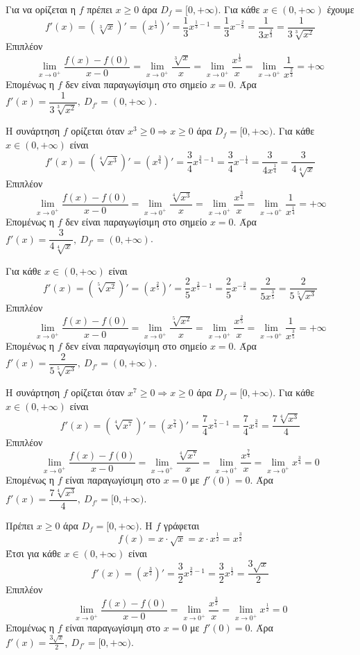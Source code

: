 \begin{alist}
\item Για να ορίζεται η $ f $ πρέπει $ x\geq 0 $ άρα $ D_f=[0,+\infty) $. Για κάθε $ x\in(0,+\infty) $ έχουμε
\[ f'(x)=(\sqrt[3]{x})'=\left(x^{\frac{1}{3}}\right)'=\frac{1}{3}x^{\frac{1}{3}-1}=\frac{1}{3}x^{-\frac{2}{3}}=\frac{1}{3x^{\frac{2}{3}}}=\frac{1}{3\sqrt[3]{x^2}} \]
Επιπλέον
\[ \lim_{x\to 0^+}{\frac{f(x)-f(0)}{x-0}}=\lim_{x\to 0^+}\frac{\sqrt[3]{x}}{x}=\lim_{x\to 0^+}{\frac{x^{\frac{1}{3}}}{x}}=\lim_{x\to 0^+}{\frac{1}{x^{\frac{2}{3}}}}=+\infty \]
Επομένως η $ f $ δεν είναι παραγωγίσιμη στο σημείο $ x=0 $. Άρα $ f'(x)=\dfrac{1}{3\sqrt[3]{x^2}},\ D_{f'}=(0,+\infty) $.
\item Η συνάρτηση $ f $ ορίζεται όταν $ x^3\geq 0\Rightarrow x\geq 0 $ άρα $ D_f=[0,+\infty) $. Για κάθε $ x\in(0,+\infty) $ είναι
\[ f'(x)=(\sqrt[4]{x^3})'=\left(x^{\frac{3}{4}}\right)'=\frac{3}{4}x^{\frac{3}{4}-1}=\frac{3}{4}x^{-\frac{1}{4}}=\frac{3}{4x^{\frac{1}{4}}}=\frac{3}{4\sqrt[4]{x}} \]
Επιπλέον
\[ \lim_{x\to 0^+}{\frac{f(x)-f(0)}{x-0}}=\lim_{x\to 0^+}\frac{\sqrt[4]{x^3}}{x}=\lim_{x\to 0^+}{\frac{x^{\frac{3}{4}}}{x}}=\lim_{x\to 0^+}{\frac{1}{x^{\frac{1}{4}}}}=+\infty \]
Επομένως η $ f $ δεν είναι παραγωγίσιμη στο σημείο $ x=0 $. Άρα $ f'(x)=\dfrac{3}{4\sqrt[4]{x}},\ D_{f'}=(0,+\infty) $.
\item Για κάθε $ x\in(0,+\infty) $ είναι
\[ f'(x)=(\sqrt[5]{x^2})'=\left(x^{\frac{2}{5}}\right)'=\frac{2}{5}x^{\frac{2}{5}-1}=\frac{2}{5}x^{-\frac{3}{5}}=\frac{2}{5x^{\frac{3}{5}}}=\frac{2}{5\sqrt[5]{x^3}} \]
Επιπλέον
\[ \lim_{x\to 0^+}{\frac{f(x)-f(0)}{x-0}}=\lim_{x\to 0^+}\frac{\sqrt[5]{x^2}}{x}=\lim_{x\to 0^+}{\frac{x^{\frac{2}{5}}}{x}}=\lim_{x\to 0^+}{\frac{1}{x^{\frac{3}{5}}}}=+\infty \]
Επομένως η $ f $ δεν είναι παραγωγίσιμη στο σημείο $ x=0 $. Άρα $ f'(x)=\dfrac{2}{5\sqrt[5]{x^3}},\ D_{f'}=(0,+\infty) $. 
\item Η συνάρτηση $ f $ ορίζεται όταν $ x^7\geq 0\Rightarrow x\geq 0 $ άρα $ D_f=[0,+\infty) $. Για κάθε $ x\in(0,+\infty) $ είναι
\[ f'(x)=(\sqrt[4]{x^7})'=\left(x^{\frac{7}{4}}\right)'=\frac{7}{4}x^{\frac{7}{4}-1}=\frac{7}{4}x^{\frac{3}{4}}=\frac{7\sqrt[4]{x^3}}{4} \]
Επιπλέον
\[ \lim_{x\to 0^+}{\frac{f(x)-f(0)}{x-0}}=\lim_{x\to 0^+}\frac{\sqrt[4]{x^7}}{x}=\lim_{x\to 0^+}{\frac{x^{\frac{7}{4}}}{x}}=\lim_{x\to 0^+}{x^{\frac{3}{4}}}=0 \]
Επομένως η $ f $ είναι παραγωγίσιμη στο $ x=0 $ με $ f'(0)=0 $. Άρα $ f'(x)=\dfrac{7\sqrt[4]{x^3}}{4},\ D_{f'}=[0,+\infty) $.
\item Πρέπει $ x\geq 0 $ άρα $ D_f=[0,+\infty) $. Η $ f $ γράφεται
\[ f(x)=x\cdot\sqrt{x}=x\cdot x^{\frac{1}{2}}=x^{\frac{3}{2}} \]
Έτσι για κάθε $ x\in(0,+\infty) $ είναι
\[ f'(x)=\left(x^{\frac{3}{2}}\right)'=\frac{3}{2}x^{\frac{3}{2}-1}=\frac{3}{2}x^{\frac{1}{2}}=\frac{3\sqrt{x}}{2} \]
Επιπλέον
\[ \lim_{x\to 0^+}{\frac{f(x)-f(0)}{x-0}}=\lim_{x\to 0^+}\frac{x^{\frac{3}{2}}}{x}=\lim_{x\to 0^+}{x^{\frac{1}{2}}}=0 \]
Επομένως η $ f $ είναι παραγωγίσιμη στο $ x=0 $ με $ f'(0)=0 $. Άρα $ f'(x)=\frac{3\sqrt{x}}{2},\ D_{f'}=[0,+\infty) $.


\end{alist}
